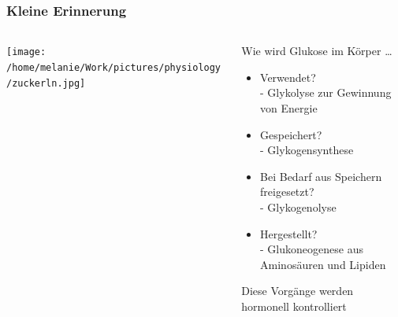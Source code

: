 \documentclass{beamer}
\begin{document}
\begin{frame}
\frametitle{Kleine Erinnerung}

\begin{columns}[c]

\begin{column}{5cm}

\begin{center}
\texttt{[image: /home/melanie/Work/pictures/physiology/zuckerln.jpg]}
\end{center}

\end{column}

\begin{column}{5cm}

Wie wird Glukose im Körper \dots

\begin{itemize}
\item
Verwendet? \\ \textcolor{theme}{- Glykolyse zur Gewinnung von Energie}
\item
Gespeichert? \\ \textcolor{theme}{- Glykogensynthese}
\item
Bei Bedarf aus Speichern freigesetzt? \\  \textcolor{theme}{- Glykogenolyse}
\item
Hergestellt? \\ \textcolor{theme}{- Glukoneogenese aus Aminosäuren und Lipiden}
\end{itemize}

\pause
Diese Vorgänge werden hormonell kontrolliert

\end{column}

\end{columns}

\end{frame}
\end{document}
